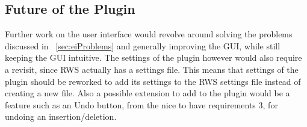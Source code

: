 \subsection{Future of the Plugin}
\label{sec:futureOfThePlugin}
Further work on the user interface would revolve around solving the problems discussed in ~\ref{sec:eiProblems} and generally improving the GUI, while still keeping the GUI intuitive. The settings of the plugin however would also require a revisit, since RWS actually has a settings file. This means that settings of the plugin should be reworked to add its settings to the RWS settings file instead of creating a new file.
Also a possible extension to add to the plugin would be a feature such as an Undo button, from the nice to have requirements 3, for undoing an insertion/deletion.


